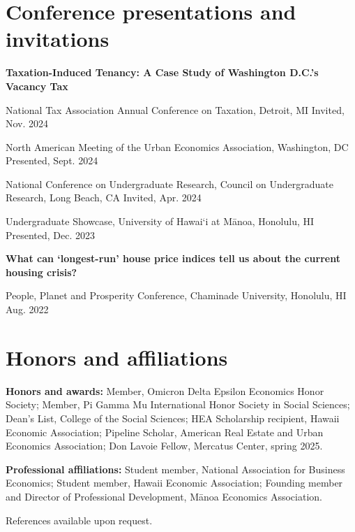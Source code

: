 \documentclass[10pt,letterpaper]{article}
\begin{document}
\section*{Conference presentations and invitations}
\textbf{Taxation-Induced Tenancy: A Case Study of Washington D.C.'s Vacancy Tax}\par
National Tax Association Annual Conference on Taxation, Detroit, MI \hfill {\small Invited, Nov. 2024}\par
North American Meeting of the Urban Economics Association, Washington, DC \hfill {\small Presented, Sept. 2024}\par
National Conference on Undergraduate Research, Council on Undergraduate Research, Long Beach, CA \hfill {\small Invited, Apr. 2024}\par
Undergraduate Showcase, University of Hawai`i at M\={a}noa, Honolulu, HI \hfill {\small Presented, Dec. 2023}\par
{}\textbf{What can `longest-run' house price indices tell us about the current housing crisis?}\par
People, Planet and Prosperity Conference, Chaminade University, Honolulu, HI \hfill {\small Aug. 2022}\par

\section*{Honors and affiliations}
\textbf{Honors and awards:} Member, Omicron Delta Epsilon Economics Honor Society; Member, Pi Gamma Mu International Honor Society in Social Sciences; Dean's List, College of the Social Sciences; HEA Scholarship recipient, Hawaii Economic Association; Pipeline Scholar, American Real Estate and Urban Economics Association; Don Lavoie Fellow, Mercatus Center, spring 2025.\par
{}\textbf{Professional affiliations:} Student member, National Association for Business Economics; Student member, Hawaii Economic Association; Founding member and Director of Professional Development, M\={a}noa Economics Association.\par
\vspace{5pt}
{\small References available upon request.}\par
\end{document}
